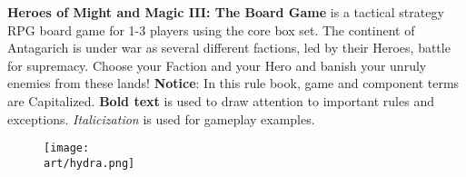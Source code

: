 
\bigbreak

\textbf{Heroes of Might and Magic III: The Board Game} is a tactical strategy RPG board game for 1-3 players using the core box set.
The continent of Antagarich is under war as several different factions, led by their Heroes, battle for supremacy. Choose your Faction and your Hero and banish your unruly enemies from these lands!
\bigbreak
\textbf{Notice}: In this rule book, game and component terms are Capitalized.
\textbf{Bold text} is used to draw attention to important rules and exceptions.
\textit{Italicization} is used for gameplay examples.
\vfill
\begin{figure}[hb]
  \centering
  \texttt{[image: \\art/hydra.png]}
\end{figure}
\vfill
